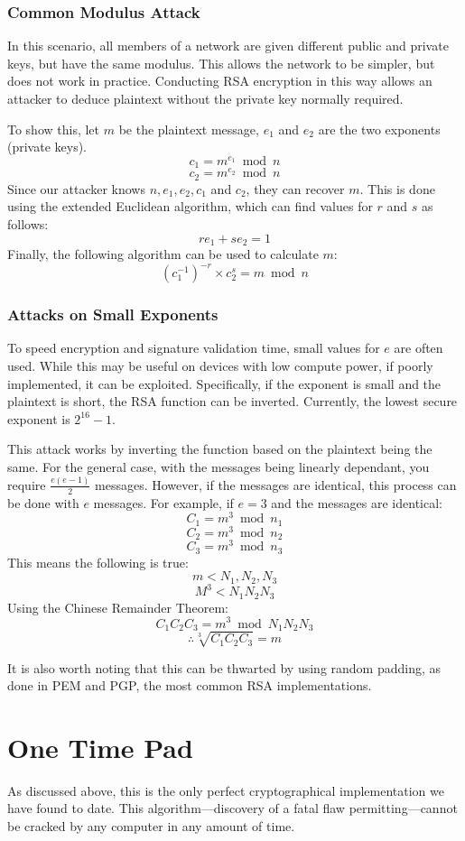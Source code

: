 			\subsubsection{Common Modulus Attack}
				In this scenario, all members of a network are given different public and private keys, but have the same modulus.
				This allows the network to be simpler, but does not work in practice.
				Conducting RSA encryption in this way allows an attacker to deduce plaintext without the private key normally required.

				To show this, let $m$ be the plaintext message, $e_1$ and $e_2$ are the two exponents (private keys).
				\[c_1 = m^{e_1}\bmod{n}\]
				\[c_2 = m^{e_2}\bmod{n}\]
				Since our attacker knows $n, e_1, e_2, c_1$ and $c_2$, they can recover $m$.
				This is done using the extended Euclidean algorithm, which can find values for $r$ and $s$ as follows:
				\[re_1 + se_2 = 1\]
				Finally, the following algorithm can be used to calculate $m$:
				\[(c^{-1}_{1})^{-r} \times c^{s}_{2} = m\bmod{n}\]

			\subsubsection{Attacks on Small Exponents}
				To speed encryption and signature validation time, small values for $e$ are often used.
				While this may be useful on devices with low compute power, if poorly implemented, it can be exploited.
				Specifically, if the exponent is small and the plaintext is short, the RSA function can be inverted.
				Currently, the lowest secure exponent is $2^{16}-1$.

				This attack works by inverting the function based on the plaintext being the same.
				For the general case, with the messages being linearly dependant, you require $\frac{e(e-1)}{2}$ messages.
				However, if the messages are identical, this process can be done with $e$ messages.
				For example, if $e = 3$ and the messages are identical:
				\[C_1 = m^3\bmod{n_1}\]
				\[C_2 = m^3\bmod{n_2}\]
				\[C_3 = m^3\bmod{n_3}\]
				This means the following is true:
				\[m < {N_1, N_2, N_3}\]
				\[M^3 < N_1N_2N_3\]
				Using the Chinese Remainder Theorem:
				\[C_1C_2C_3 = m^3\bmod{N_1N_2N_3}\]
				\[\therefore \sqrt[3]{C_1C_2C_3} = m\]

				It is also worth noting that this can be thwarted by using random padding, as done in PEM and PGP, the most common RSA implementations.
	\section{One Time Pad}
		As discussed above, this is the only perfect cryptographical implementation we have found to date.
		This algorithm---discovery of a fatal flaw permitting---cannot be cracked by any computer in any amount of time.

